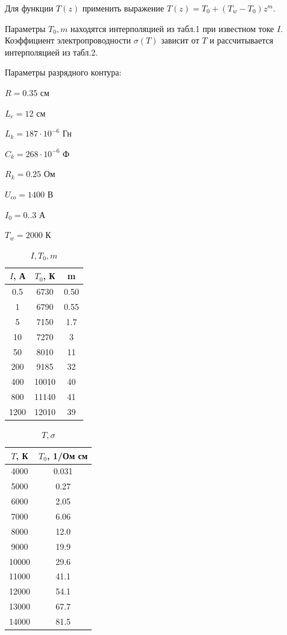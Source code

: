 \documentclass[a4paper,14pt]{article}
\begin{document}
Для функции $T(z)$ применить выражение $T(z) = T_0 + (T_w - T_0)z^m$.

Параметры $T_0, m$ находятся интерполяцией из табл.1 при известном токе $I$.
Коэффициент электропроводности $\sigma(T)$ зависит от $T$ и рассчитывается интерполяцией из  табл.2.

Параметры разрядного контура:

$R = 0.35$ см

$L_e = 12$ см

$L_k = 187 \cdot 10 ^{-6}$ Гн

$C_k = 268 \cdot 10^{-6}$ Ф

$R_k = 0.25$ Ом

$U_{co} = 1400$ В

$I_0 = 0..3$ А

$T_w = 2000$ К

\begin{table}
\caption{\label{tab:canonsummary} $I, T_0, m$}
\begin{center}
\begin{tabular}{|c|c|c|}
\hline
$I$, А & $T_0$, К & m \\
\hline
0.5 & 6730 & 0.50 \\
1 & 6790 & 0.55 \\
5 & 7150 & 1.7 \\
10 & 7270 & 3 \\
50 & 8010 & 11 \\
200 & 9185 & 32 \\
400 & 10010 & 40 \\
800 & 11140 & 41 \\
1200 & 12010 & 39 \\
\hline
\end{tabular}
\end{center}
\end{table} 

\begin{table}
\caption{\label{tab:canonsummary} $T, \sigma $}
\begin{center}
\begin{tabular}{|c|c|}
\hline
$T$, К & $T_0$, 1/Ом см \\
\hline
4000 & 0.031 \\
5000 & 0.27 \\
6000 & 2.05 \\
7000 & 6.06 \\
8000 & 12.0 \\
9000 & 19.9 \\ 
10000 & 29.6 \\
11000 & 41.1 \\
12000 & 54.1 \\
13000 & 67.7 \\
14000 & 81.5 \\
\hline
\end{tabular}
\end{center}
\end{table} 
\end{document}
